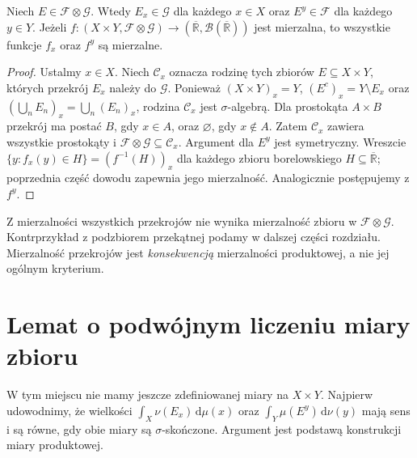 \begin{lemat}
\label{lem:sections-measurable-12}
Niech $E\in\mathcal F\otimes\mathcal G$.
Wtedy $E_x\in\mathcal G$ dla każdego $x\in X$
oraz $E^y\in\mathcal F$ dla każdego $y\in Y$.
Jeżeli $f:(X\times Y,\mathcal F\otimes\mathcal G)
\to(\overline{\mathbb R},\mathcal B(\overline{\mathbb R}))$
jest mierzalna, to wszystkie funkcje $f_x$ oraz $f^y$
są mierzalne.
\end{lemat}
\begin{proof}
Ustalmy $x\in X$. Niech $\mathcal C_x$ oznacza rodzinę
tych zbiorów $E\subseteq X\times Y$, których przekrój
$E_x$ należy do $\mathcal G$. Ponieważ
$(X\times Y)_x=Y$, $(E^c)_x=Y\setminus E_x$ oraz
$(\bigcup_nE_n)_x=\bigcup_n(E_n)_x$, rodzina
$\mathcal C_x$ jest $\sigma$-algebrą. Dla prostokąta
$A\times B$ przekrój ma postać $B$, gdy $x\in A$,
oraz $\varnothing$, gdy $x\notin A$. Zatem
$\mathcal C_x$ zawiera wszystkie prostokąty i
$\mathcal F\otimes\mathcal G\subseteq\mathcal C_x$.
Argument dla $E^y$ jest symetryczny. Wreszcie
$\{y:f_x(y)\in H\}=(f^{-1}(H))_x$ dla każdego
zbioru borelowskiego $H\subseteq\overline{\mathbb R}$;
poprzednia część dowodu zapewnia jego mierzalność.
Analogicznie postępujemy z $f^y$.
\end{proof}

\begin{uwaga}
Z mierzalności wszystkich przekrojów nie wynika
mierzalność zbioru w $\mathcal F\otimes\mathcal G$.
Kontrprzykład z podzbiorem przekątnej podamy w dalszej
części rozdziału. Mierzalność przekrojów jest
\emph{konsekwencją} mierzalności produktowej, a nie
jej ogólnym kryterium.
\end{uwaga}

\section{Lemat o podwójnym liczeniu miary zbioru}

W tym miejscu nie mamy jeszcze zdefiniowanej miary na
$X\times Y$. Najpierw udowodnimy, że wielkości
$\int_X\nu(E_x)\,\mathrm d\mu(x)$ oraz
$\int_Y\mu(E^y)\,\mathrm d\nu(y)$ mają sens
i są równe, gdy obie miary są $\sigma$-skończone.
Argument jest podstawą konstrukcji miary produktowej.

